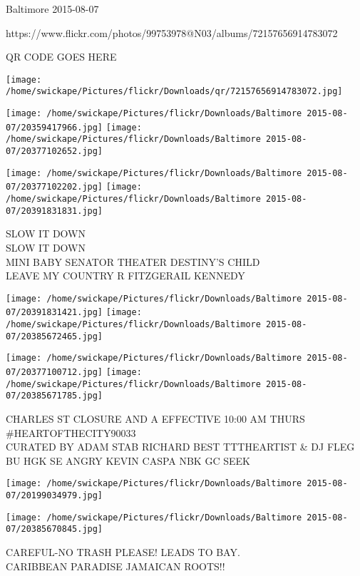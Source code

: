 \documentclass[10pt,letterpaper]{article}
\begin{document}
Baltimore 2015-08-07

https://www.flickr.com/photos/99753978@N03/albums/72157656914783072

QR CODE GOES HERE

\texttt{[image: /home/swickape/Pictures/flickr/Downloads/qr/72157656914783072.jpg]}
\pagebreak

\texttt{[image: /home/swickape/Pictures/flickr/Downloads/Baltimore 2015-08-07/20359417966.jpg]}
\texttt{[image: /home/swickape/Pictures/flickr/Downloads/Baltimore 2015-08-07/20377102652.jpg]}

\texttt{[image: /home/swickape/Pictures/flickr/Downloads/Baltimore 2015-08-07/20377102202.jpg]}
\texttt{[image: /home/swickape/Pictures/flickr/Downloads/Baltimore 2015-08-07/20391831831.jpg]}

SLOW IT DOWN\\
SLOW IT DOWN\\
MINI BABY SENATOR THEATER DESTINY'S CHILD\\
LEAVE MY COUNTRY R FITZGERAIL KENNEDY\\
\pagebreak

\texttt{[image: /home/swickape/Pictures/flickr/Downloads/Baltimore 2015-08-07/20391831421.jpg]}
\texttt{[image: /home/swickape/Pictures/flickr/Downloads/Baltimore 2015-08-07/20385672465.jpg]}

\texttt{[image: /home/swickape/Pictures/flickr/Downloads/Baltimore 2015-08-07/20377100712.jpg]}
\texttt{[image: /home/swickape/Pictures/flickr/Downloads/Baltimore 2015-08-07/20385671785.jpg]}

CHARLES ST CLOSURE AND A EFFECTIVE 10:00 AM THURS\\
\#HEARTOFTHECITY90033\\
CURATED BY ADAM STAB RICHARD BEST TTTHEARTIST \& DJ FLEG\\
BU HGK SE ANGRY KEVIN CASPA NBK GC SEEK\\
\pagebreak

\texttt{[image: /home/swickape/Pictures/flickr/Downloads/Baltimore 2015-08-07/20199034979.jpg]}

\vspace{0.25in}
\texttt{[image: /home/swickape/Pictures/flickr/Downloads/Baltimore 2015-08-07/20385670845.jpg]}

CAREFUL{-}NO TRASH PLEASE! LEADS TO BAY.\\
CARIBBEAN PARADISE JAMAICAN ROOTS!!\\
\pagebreak
\end{document}
